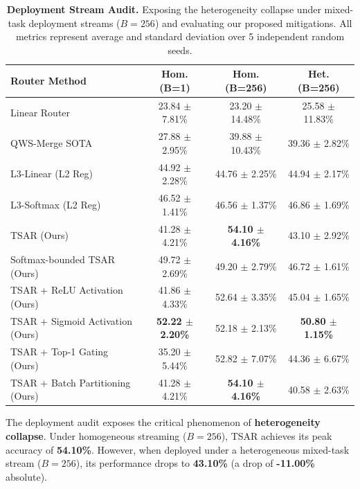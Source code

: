 \begin{table}[t]
\caption{\textbf{Deployment Stream Audit.} Exposing the heterogeneity collapse under mixed-task deployment streams ($B=256$) and evaluating our proposed mitigations. All metrics represent average and standard deviation over 5 independent random seeds.}
\label{tab:stream_audit}
\vskip 0.15in
\begin{center}
\begin{small}
\begin{sc}
\setlength{\tabcolsep}{8pt}
\begin{tabular}{lccc}
\toprule
Router Method & Hom. (B=1) & Hom. (B=256) & Het. (B=256) \\
\midrule
Linear Router & 23.84 $\pm$ 7.81\% & 23.20 $\pm$ 14.48\% & 25.58 $\pm$ 11.83\% \\
QWS-Merge SOTA & 27.88 $\pm$ 2.95\% & 39.88 $\pm$ 10.43\% & 39.36 $\pm$ 2.82\% \\
L3-Linear (L2 Reg) & 44.92 $\pm$ 2.28\% & 44.76 $\pm$ 2.25\% & 44.94 $\pm$ 2.17\% \\
L3-Softmax (L2 Reg) & 46.52 $\pm$ 1.41\% & 46.56 $\pm$ 1.37\% & 46.86 $\pm$ 1.69\% \\
TSAR (Ours) & 41.28 $\pm$ 4.21\% & \textbf{54.10 $\pm$ 4.16\%} & 43.10 $\pm$ 2.92\% \\
\midrule
Softmax-bounded TSAR (Ours) & 49.72 $\pm$ 2.69\% & 49.20 $\pm$ 2.79\% & 46.72 $\pm$ 1.61\% \\
TSAR + ReLU Activation (Ours) & 41.86 $\pm$ 4.33\% & 52.64 $\pm$ 3.35\% & 45.04 $\pm$ 1.65\% \\
TSAR + Sigmoid Activation (Ours) & \textbf{52.22 $\pm$ 2.20\%} & 52.18 $\pm$ 2.13\% & \textbf{50.80
$\pm$ 1.15\%} \\
TSAR + Top-1 Gating (Ours) & 35.20 $\pm$ 5.44\% & 52.82 $\pm$ 7.07\% & 44.36 $\pm$ 6.67\% \\
TSAR + Batch Partitioning (Ours) & 41.28 $\pm$ 4.21\% & \textbf{54.10 $\pm$ 4.16\%} & 40.58 $\pm$
2.63\% \\
\bottomrule
\end{tabular}
\end{sc}
\end{small}
\end{center}
\vskip -0.1in
\end{table}

The deployment audit exposes the critical phenomenon of \textbf{heterogeneity collapse}. Under
homogeneous streaming ($B=256$), TSAR achieves its peak accuracy of \textbf{54.10\%}. However, when
deployed under a heterogeneous mixed-task stream ($B=256$), its performance drops to
\textbf{43.10\%} (a drop of \textbf{-11.00\%} absolute). 

